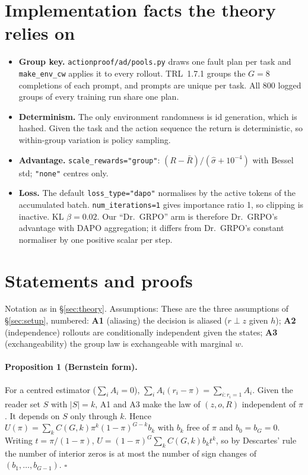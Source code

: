\section{Implementation facts the theory relies on}\label{app3:impl}
\begin{itemize}
\item \textbf{Group key.} \texttt{actionproof/ad/pools.py} draws one fault plan per task and \texttt{make\_env\_cw}
applies it to every rollout. TRL~1.7.1 groups the $G{=}8$ completions of each prompt, and prompts are unique per task.
All 800 logged groups of every training run share one plan.
\item \textbf{Determinism.} The only environment randomness is id generation, which is hashed. Given the task and the
action sequence the return is deterministic, so within-group variation is policy sampling.
\item \textbf{Advantage.} \texttt{scale\_rewards="group"}: $(R-\bar R)/(\hat\sigma+10^{-4})$ with Bessel std;
\texttt{"none"} centres only.
\item \textbf{Loss.} The default \texttt{loss\_type="dapo"} normalises by the active tokens of the accumulated batch.
\texttt{num\_iterations=1} gives importance ratio 1, so clipping is inactive. KL $\beta=0.02$. Our ``Dr.~GRPO'' arm is
therefore Dr.~GRPO's advantage with DAPO aggregation; it differs from Dr.~GRPO's constant normaliser by one positive
scalar per step.
\end{itemize}

\section{Statements and proofs}\label{app3:proofs}
Notation as in \S\ref{sec:theory}. Assumptions:
These are the three assumptions of \S\ref{sec:setup}, numbered: \textbf{A1} (aliasing) the decision is aliased ($r\perp z$ given $h$);
\textbf{A2} (independence) rollouts are conditionally independent given the states;
\textbf{A3} (exchangeability) the group law is exchangeable with marginal $w$.

\paragraph{Proposition 1 (Bernstein form).} For a centred estimator ($\sum_iA_i=0$),
$\sum_iA_i(r_i-\pi)=\sum_{i:r_i=1}A_i$. Given the reader set $S$ with $|S|=k$, A1 and A3 make the law of
$(z,o,R)$ independent of $\pi$. It depends on $S$ only through $k$. Hence
$U(\pi)=\sum_kC(G,k)\pi^k(1-\pi)^{G-k}b_k$ with $b_k$ free of $\pi$ and $b_0=b_G=0$. Writing $t=\pi/(1-\pi)$,
$U=(1-\pi)^G\sum_kC(G,k)b_kt^k$, so by Descartes' rule the number of interior zeros is at most the number of sign
changes of $(b_1,\dots,b_{G-1})$. $\square$

